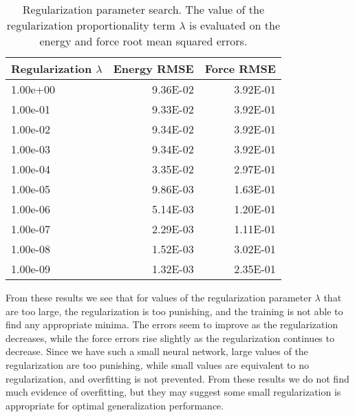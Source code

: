 \begin{table}[H]
\centering
\caption{Regularization parameter search. The value of the regularization
    proportionality term $\lambda$ is evaluated on the energy and force
    root mean squared errors.}
\label{table:overfit}
\begin{tabular}{lrr} 
\toprule
Regularization $\lambda$ &  Energy RMSE &  Force RMSE \\
\midrule
     1.00e+00 &     9.36E-02 &    3.92E-01 \\
     1.00e-01 &     9.33E-02 &    3.92E-01 \\
     1.00e-02 &     9.34E-02 &    3.92E-01 \\
     1.00e-03 &     9.34E-02 &    3.92E-01 \\
     1.00e-04 &     3.35E-02 &    2.97E-01 \\
     1.00e-05 &     9.86E-03 &    1.63E-01 \\
     1.00e-06 &     5.14E-03 &    1.20E-01 \\
     1.00e-07 &     2.29E-03 &    1.11E-01 \\
     1.00e-08 &     1.52E-03 &    3.02E-01 \\
     1.00e-09 &     1.32E-03 &    2.35E-01 \\
\bottomrule
\end{tabular}
\end{table}

From these results we see that for values of the regularization parameter
$\lambda$
that are too large, the regularization is too punishing,
and the training is not able to find any appropriate minima.
The errors seem to improve as the regularization decreases,
while the force errors rise slightly as the regularization continues
to decrease.
Since we have such a small neural network, large values of the regularization
are too punishing, while small values are equivalent to no regularization,
and overfitting is not prevented. 
From these results we do not find much evidence of overfitting, but
they may suggest some small regularization is appropriate for
optimal generalization performance.


